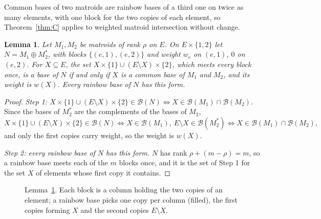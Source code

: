 \documentclass[11pt]{article}
\newtheorem{lemma}[theorem]{Lemma}
\newcommand{\Bases}{\mathcal B}
\begin{document}
Common bases of two matroids are rainbow bases of a third one on twice as many
elements, with one block for the two copies of each element, so
Theorem~\ref{thm:C} applies to weighted matroid intersection without change.

\begin{lemma}
\label{lem:doubling}
Let $M_1,M_2$ be matroids of rank $\rho$ on $E$.  On $E\times\{1,2\}$ let
$N=M_1\oplus M_2^{*}$, with blocks $\{(e,1),(e,2)\}$ and weight $w_e$ on $(e,1)$,
$0$ on $(e,2)$.  For $X\subseteq E$, the set $X\times\{1\}\cup(E\setminus X)\times\{2\}$,
which meets every block once, is a base of $N$ if and only if $X$ is a common base
of $M_1$ and $M_2$, and its weight is $w(X)$.  Every rainbow base of $N$ has this
form.
\end{lemma}

\begin{proof}
\emph{Step 1: $X\times\{1\}\cup(E\setminus X)\times\{2\}\in\Bases(N)\iff X\in\Bases(M_1)\cap\Bases(M_2)$.}  Since the bases of $M_2^{*}$ are the complements of
the bases of $M_2$,
\[
  X\times\{1\}\cup(E\setminus X)\times\{2\}\in\Bases(N)
  \iff X\in\Bases(M_1),\ E\setminus X\in\Bases(M_2^{*})
  \iff X\in\Bases(M_1)\cap\Bases(M_2),
\]
and only the first copies carry weight, so the weight is $w(X)$.

\emph{Step 2: every rainbow base of $N$ has this form.}  $N$ has rank $\rho+(m-\rho)=m$, so a rainbow
base meets each of the $m$ blocks once, and it is the set of Step 1 for the set
$X$ of elements whose first copy it contains.
\end{proof}

\begin{figure}[t]
  \centering
  \caption{Lemma~\ref{lem:doubling}.  Each block is a column holding the two
  copies of an element; a rainbow base picks one copy per column (filled), the
  first copies forming $X$ and the second copies $E\setminus X$.}
  \label{fig:double}
\end{figure}
\end{document}
